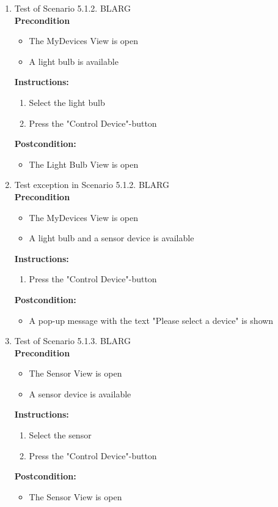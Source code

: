 \documentclass[a4paper]{article}
\newlength{\testlabellength}
\newenvironment{testlist}{\begin{enumerate}[label=\bfseries Instruction \thesubsection.\arabic* , labelindent=0pt, labelwidth=\testlabellength , leftmargin=2cm]}{\end{enumerate}}
\newenvironment{precondition}{
{\color{white}BLARG}\\ 
\textbf{Precondition}
\begin{itemize}[labelindent=0cm, labelwidth=2cm , leftmargin=1cm]
}
{\end{itemize}}
\newenvironment{instruction}{
\textbf{Instructions:}
\begin{enumerate}[label=\bfseries  \arabic*., labelindent=0cm, labelwidth=2cm , leftmargin=1cm]
}
{\end{enumerate}}
\newenvironment{postcondition}{
\textbf{Postcondition:}
\begin{itemize}[labelindent=0cm, labelwidth=2cm , leftmargin=1cm]
}
{\end{itemize}}
\begin{document}
\begin{appendices}
\begin{testlist}
	\item Test of Scenario 5.1.2. 
		\begin{precondition}
			\item The MyDevices View is open
			\item A light bulb is available
		\end{precondition}
		\begin{instruction}
			\item Select the light bulb
			\item Press the "Control Device"-button
		\end{instruction}
		\begin{postcondition}
			\item The Light Bulb View is open
		\end{postcondition}

	\item Test exception in Scenario 5.1.2. \label{SystemTest1}
		\begin{precondition}
			\item The MyDevices View is open
			\item A light bulb and a sensor device is available
		\end{precondition}
		\begin{instruction}
			\item Press the "Control Device"-button
		\end{instruction}
		\begin{postcondition}
			\item A pop-up message with the text "Please select a device" is shown
		\end{postcondition}	

	\item Test of Scenario 5.1.3.
		\begin{precondition}
			\item The Sensor View is open
			\item A sensor device is available
		\end{precondition}
		\begin{instruction}
			\item Select the sensor
			\item Press the "Control Device"-button
		\end{instruction}
		\begin{postcondition}
			\item The Sensor View is open
		\end{postcondition}



\end{testlist}
\end{appendices}
\end{document}
